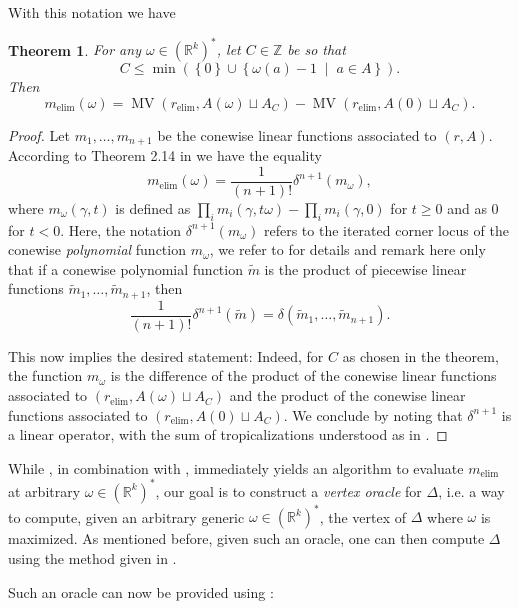 \documentclass[a4paper]{article}
\newtheorem{theorem}{Theorem}
\theoremstyle{remark}
\newcommand{\set}[1]{\left\{#1\right\}}
\newcommand{\setdes}[2]{\left\{#1\;\middle|\;#2\right\}}
\def\RR{\mathbb{R}}
\def\ZZ{\mathbb{Z}}
\DeclareMathOperator{\mv}{MV}
\def\melim{m_{\text{elim}}}
\begin{document}
With this notation we have
\begin{theorem}
  \label{thm:msv}
  For any $\omega\in (\RR^{k})^{*}$, let $C\in \ZZ$ be so that 
  \[C\leq \min\left(\set{0}\cup \setdes{\omega(a)-1}{a\in A}\right).\]
  Then
  \[\melim(\omega) = \mv(r_{\text{elim}},A(\omega) \sqcup A_C) - \mv(r_{\text{elim}},A(0) \sqcup A_C).\]
\end{theorem}
\begin{proof}
  Let $m_1,\dots,m_{n+1}$ be the conewise linear functions associated
  to $(r,A)$. According to Theorem 2.14 in
  \cite{esterovEngineeredCompleteIntersections2025} we have the
  equality
  \[\melim(\omega) = \frac{1}{(n+1)!}\delta^{n+1}(m_{\omega}),\]
  where $m_{\omega}(\gamma,t)$ is defined as
  $\prod_im_i(\gamma,t\omega) - \prod_im_i(\gamma,0)$ for $t\geq 0$ and as
  $0$ for $t < 0$. Here, the notation $\delta^{n+1}(m_{\omega})$ refers to the
  iterated corner locus of the conewise \textit{polynomial} function
  $m_{\omega}$, we refer to \cite{esterovTropicalVarietiesPolynomial2012}
  for details and remark here only that if a conewise polynomial
  function $\tilde{m}$ is the product of piecewise linear functions
  $\tilde{m}_1,\ldots,\tilde{m}_{n+1}$, then
  \[\frac{1}{(n+1)!}\delta^{n+1}(\tilde{m}) = \delta(\tilde{m}_1,\ldots,\tilde{m}_{n+1}).\]

  This now implies the desired statement: Indeed, for $C$ as chosen in
  the theorem, the function $m_{\omega}$ is the difference of the product
  of the conewise linear functions associated to
  $(r_{\text{elim}},A(\omega) \sqcup A_C)$ and the product of the conewise linear
  functions associated to $(r_{\text{elim}},A(0)\sqcup A_C)$. We conclude by noting
  that $\delta^{n+1}$ is a linear operator, with the sum of
  tropicalizations understood as in
  \cite{esterovTropicalVarietiesPolynomial2012}.
\end{proof}

While , in combination with , immediately
yields an algorithm to evaluate $\melim$ at arbitrary
$\omega\in (\RR^{k})^{*}$, our goal is to construct a {\em vertex oracle} for
$\Delta$, i.e. a way to compute, given an arbitrary generic
$\omega\in (\RR^{k})^{*}$, the vertex of $\Delta$ where $\omega$ is maximized. As
mentioned before, given such an oracle, one can then compute $\Delta$ using
the method given in \cite{hugginsIB4eSoftwareFramework2006}.

Such an oracle can now be provided using : 
\end{document}
